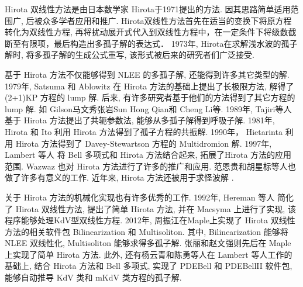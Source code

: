 Hirota 双线性方法是由日本数学家 Hirota\cite{hirota1971exact}于1971提出的方法. 因其思路简单\D 适用范围广, 后被众多学者应用和推广. Hirota双线性方法首先在适当的变换下将原方程转化为双线性方程, 再将扰动展开式代入到双线性方程中，在一定条件下将级数截断至有限项，最后构造出多孤子解的表达式． 1973年, Hirota\cite{hirota1973exact}在求解浅水波的孤子解时, 将多孤子解的生成公式重写, 该形式被后来的研究者们广泛接受. 

基于 Hirota 方法不仅能够得到 NLEE 的多孤子解, 还能得到许多其它类型的解. 1979年, Satsuma 和 Ablowitz\cite{satsuma1979two} 在 Hirota 方法的基础上提出了长极限方法, 解得了(2+1)KP 方程\cite{kadomtsev1970stability}的 lump 解. 后来, 有许多研究者基于他们的方法得到了其它方程的 lump 解. 如 Gilson\cite{gilson1990lump}\D 马文秀\cite{ma2015lump}\D 张岩\cite{zhangYTSF,zhang2018m}\D Sun Hong Qian\cite{sun2017lump}\D 和 Cheng Li\cite{cheng2017lump}等. 1989年, Tajiri等人\cite{tajiri1989breather}基于 Hirota 方法提出了共轭参数法, 能够从多孤子解得到呼吸子解. 1981年, Hirota 和 Ito \cite{hirota1983resonance}利用 Hirota 方法得到了孤子方程的共振解. 1990年， Hietarinta \cite{hietarinta1990multidromion} 利用 Hirota 方法得到了 Davey-Stewartson 方程的 Multidromion 解. 1997年, Lambert 等人\cite{gilson1996combinatorics,lambert1997construction} 将 Bell 多项式和 Hirota 方法结合起来, 拓展了Hirota 方法的应用范围. Wazwaz\cite{wazwaz2008multiple} 也对 Hirota 方法进行了许多的推广和应用. 范恩贵\cite{fan2011new}和胡星标\cite{hu1999soliton,hu2002application,hirota2003vector}等人也做了许多有意义的工作. 近年来, Hirota 方法还被用于求怪波解 \cite{guo2011rogue,sun2018general,zhaqilao2018symbolic}.

关于 Hirota 方法的机械化实现也有许多优秀的工作. 1992年, Hereman 等人\cite{hereman1992symbolic,hereman1991macsyma} 简化了 Hirota 双线性方法, 提出了简单 Hirota 方法, 并在 Macsyma 上进行了实现, 该程序能够处理KdV型双线性方程. 2012年, 周振江\cite{zhou2012}在Maple上实现了 Hirota 双线性方法的相关软件包 Bilinearization 和 Multisoliton. 其中, Bilinearization 能够将 NLEE 双线性化, Multisoliton 能够求得多孤子解. 张丽\cite{zhang2014}和赵文强\cite{zwq2016}则先后在 Maple 上实现了简单 Hirota 方法. 此外, 还有杨云青和陈勇等人\cite{yang2011,miao2014pdebellii}在 Lambert 等人工作的基础上, 结合 Hirota 方法和 Bell 多项式, 实现了 PDEBell 和 PDEBellII 软件包, 能够自动推导 KdV 类和 mKdV 类方程的孤子解. 

